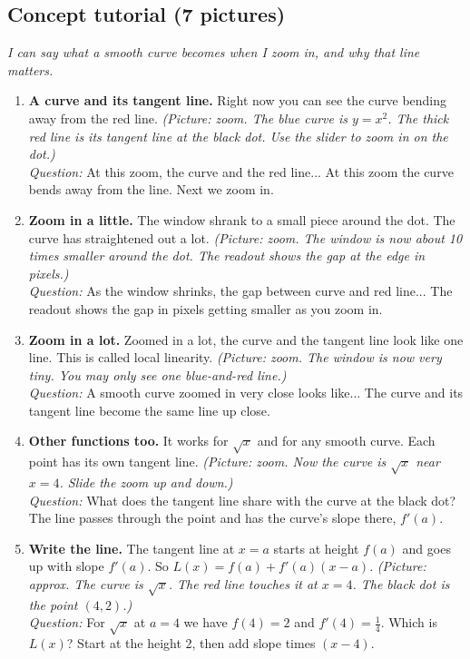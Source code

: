 \documentclass[11pt]{article}
\begin{document}
\subsection*{Concept tutorial (7 pictures)}
\textit{I can say what a smooth curve becomes when I zoom in, and why that line matters.}\par
\begin{enumerate}
\item \textbf{A curve and its tangent line.} Right now you can see the curve bending away from the red line. \textit{(Picture: zoom. The blue curve is $y=x^2$. The thick red line is its tangent line at the black dot. Use the slider to zoom in on the dot.)}\\ \textit{Question:} At this zoom, the curve and the red line...  At this zoom the curve bends away from the line. Next we zoom in.
\item \textbf{Zoom in a little.} The window shrank to a small piece around the dot. The curve has straightened out a lot. \textit{(Picture: zoom. The window is now about 10 times smaller around the dot. The readout shows the gap at the edge in pixels.)}\\ \textit{Question:} As the window shrinks, the gap between curve and red line...  The readout shows the gap in pixels getting smaller as you zoom in.
\item \textbf{Zoom in a lot.} Zoomed in a lot, the curve and the tangent line look like one line. This is called local linearity. \textit{(Picture: zoom. The window is now very tiny. You may only see one blue-and-red line.)}\\ \textit{Question:} A smooth curve zoomed in very close looks like...  The curve and its tangent line become the same line up close.
\item \textbf{Other functions too.} It works for $\sqrt{x}$ and for any smooth curve. Each point has its own tangent line. \textit{(Picture: zoom. Now the curve is $\sqrt{x}$ near $x=4$. Slide the zoom up and down.)}\\ \textit{Question:} What does the tangent line share with the curve at the black dot?  The line passes through the point and has the curve's slope there, $f'(a)$.
\item \textbf{Write the line.} The tangent line at $x=a$ starts at height $f(a)$ and goes up with slope $f'(a)$. So $L(x)=f(a)+f'(a)(x-a)$. \textit{(Picture: approx. The curve is $\sqrt{x}$. The red line touches it at $x=4$. The black dot is the point $(4,2)$.)}\\ \textit{Question:} For $\sqrt{x}$ at $a=4$ we have $f(4)=2$ and $f'(4)=\tfrac14$. Which is $L(x)$?  Start at the height 2, then add slope times $(x-4)$.

\end{enumerate}
\end{document}
